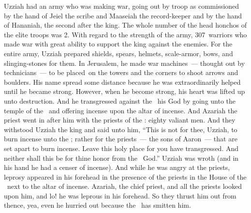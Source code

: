 \begin{inparaenum}
   Uzziah had an army who was making war, going out by troop as commissioned by the hand of Jeiel the scribe and Maaseiah the record-keeper and by the hand of Hananiah, the second after the king.%
   The whole number of the head honchos of the elite troops was 2.%
   With regard to the strength of the army, 307~warriors who made war with great ability to support the king against the enemies.%
   For the entire army, Uzziah prepared shields, spears, helmets, scale-armor, bows, and slinging-stones for them.%
   In Jerusalem, he made war machines~--- thought out by technicians~--- to be placed\understood{}\ on the towers and the corners to shoot arrows and boulders. His name spread some distance because he was extraordinarily helped  until he became strong.%
   However, when he become strong, his heart was lifted up unto destruction. And he transgressed against the \lord\ his God by going unto the temple of the \lord\ and offering incense upon the altar of incense.%
   And Azariah the priest went in after him with the priests of the \lord: eighty valiant men.%
   And they withstood Uzziah the king and said unto him, ``This is not for thee, Uzziah, to burn incense unto the \lord; rather for the priests~--- the sons of Aaron~--- that are set apart to burn incense. Leave this holy place for you have transgressed. And neither shall this be for thine honor from the \lord\ God.''%
   Uzziah was wroth (and in his hand he had a censer of incense). And while he was angry at the priests, leprosy appeared in his forehead in the presence of the priests in the House of the \lord\ next to the altar of incense.%
   Azariah, the chief priest, and all the priests looked upon him, and lo! he was leprous in his forehead. So they thrust him out from thence, yea, even he hurried out because the \lord\ has smitten him.%

\end{inparaenum}
